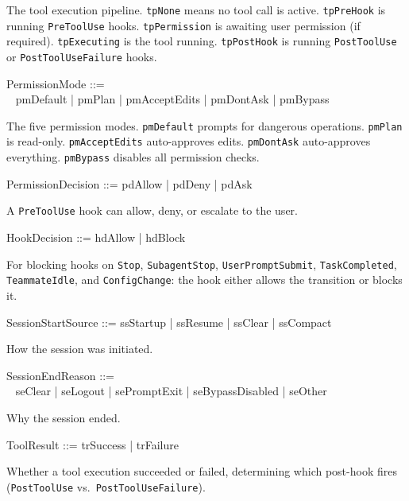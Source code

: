 \documentclass[a4paper,10pt,fleqn]{article}
\begin{document}
The tool execution pipeline. \texttt{tpNone} means no tool call is
active. \texttt{tpPreHook} is running \texttt{PreToolUse} hooks.
\texttt{tpPermission} is awaiting user permission (if required).
\texttt{tpExecuting} is the tool running. \texttt{tpPostHook} is
running \texttt{PostToolUse} or \texttt{PostToolUseFailure} hooks.

\begin{zed}
  PermissionMode ::= \\
  \quad~ pmDefault | pmPlan | pmAcceptEdits | pmDontAsk | pmBypass
\end{zed}

The five permission modes. \texttt{pmDefault} prompts for dangerous
operations. \texttt{pmPlan} is read-only. \texttt{pmAcceptEdits}
auto-approves edits. \texttt{pmDontAsk} auto-approves everything.
\texttt{pmBypass} disables all permission checks.

\begin{zed}
  PermissionDecision ::= pdAllow | pdDeny | pdAsk
\end{zed}

A \texttt{PreToolUse} hook can allow, deny, or escalate to the user.

\begin{zed}
  HookDecision ::= hdAllow | hdBlock
\end{zed}

For blocking hooks on \texttt{Stop}, \texttt{SubagentStop},
\texttt{UserPromptSubmit}, \texttt{TaskCompleted}, \texttt{TeammateIdle},
and \texttt{ConfigChange}: the hook either allows the transition or
blocks it.

\begin{zed}
  SessionStartSource ::= ssStartup | ssResume | ssClear | ssCompact
\end{zed}

How the session was initiated.

\begin{zed}
  SessionEndReason ::= \\
  \quad~ seClear | seLogout | sePromptExit | seBypassDisabled | seOther
\end{zed}

Why the session ended.

\begin{zed}
  ToolResult ::= trSuccess | trFailure
\end{zed}

Whether a tool execution succeeded or failed, determining which
post-hook fires (\texttt{PostToolUse} vs.\ \texttt{PostToolUseFailure}).
\end{document}
